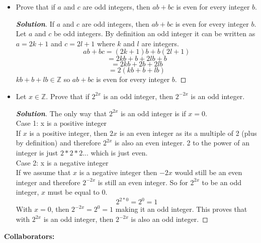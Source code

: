 \documentclass[11pt]{article}
\newenvironment{problem}[2][Problem\!]{\begin{trivlist}
\item[\hskip \labelsep {\bfseries #1}\hskip \labelsep {\bfseries #2.}]}{\end{trivlist}}
\newenvironment{solution}{\begin{proof}[\textbf{\textit{Solution}}]}{\end{proof}}
\newcommand{\zz}{\mathbb Z}   %
\begin{document}
\begin{problem}{3.3}\hfill
\begin{itemize}[itemsep=3em]
\item[(a)] Prove that if $a$ and $c$ are odd integers, then $ab + bc$ is even for every integer $b$.
\begin{solution}
    If \(a\) and \(c\) are odd integers, then \(ab+bc\) is even for every integer \(b\). Let \(a\) and \(c\) be odd integers.  By definition an odd integer it can be written as \(a = 2k + 1\) and \(c = 2l + 1\) where \(k\) and \(l\) are integers.
    \[ab+bc = (2k+1)b+b(2l+1)\]
    \[=2kb+b+2lb+b\]
    \[=2kb+2b+2lb\]
    \[=2(kb+b+lb)\]
    \(kb+b+lb \in \zz\) so \(ab+bc\) is even for every integer \(b\).
\end{solution}

\item[(b)] Let $x \in \zz$. Prove that if $2^{2x}$ is an odd integer, then $2^{-2x}$ is an odd integer.
\begin{solution}
The only way that \(2^{2x}\) is an odd integer is if \(x = 0\). \\
Case 1: x is a positive integer\\
If \(x\) is a positive integer, then \(2x\) is an even integer as its a multiple of 2 (plus by definition) and therefore \(2^{2x}\) is also an even integer. 2 to the power of an integer is just \(2 * 2 * 2...\) which is just even.\\
Case 2: x is a negative integer\\
If we assume that \(x\) is a negative integer then \(-2x\) would still be an even integer and therefore \(2^{-2x}\) is still an even integer. So for \(2^{2x}\) to be an odd integer, \(x\) must be equal to 0. 
\[2^{2*0} = 2^{0} = 1\]
With \(x = 0\), then \(2^{-2x} = 2^{0} = 1\) making it an odd integer. This proves that with \(2^{2x}\) is an odd integer, then \(2^{-2x}\) is also an odd integer.
\end{solution}

\end{itemize}
\end{problem}

\newpage  %

\begin{center}
\textbf{Collaborators:}
\end{center}
\vfill 
\end{document}
